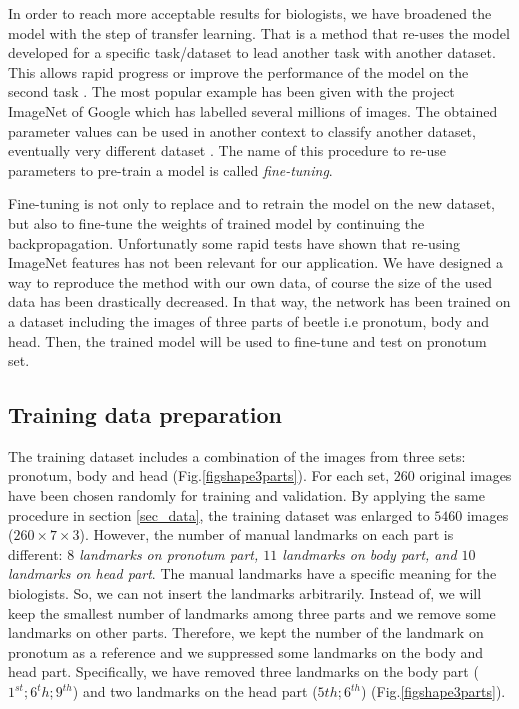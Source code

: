 \documentclass[10pt]{article}
\begin{document}
In order to reach more acceptable results for biologists, we have
broadened the model with the step of transfer learning. That is a
method that re-uses the model developed for a specific task/dataset
to lead  another task with another dataset. This allows rapid progress or improve the performance of the
model on the second task \cite{torrey2009transfer}. The most popular
example has been given with the project ImageNet of Google \cite{imagenet_cvpr09} which has labelled several millions of images. The obtained parameter values can
be used in another context to classify another dataset, eventually
very different dataset \cite{margeta_mri}. The name of this procedure to re-use parameters
to pre-train a model is called \textit{fine-tuning}.

Fine-tuning is not only to replace and to retrain the model on the new
dataset, but also to fine-tune the weights of trained model by continuing the
backpropagation. Unfortunatly some rapid tests have shown that
re-using ImageNet features has not been relevant for our
application. We have designed a way to reproduce the method with our
own data, of course the size of the used data has been drastically decreased.
In that way, the network has been trained on a dataset including
the images of three parts of beetle i.e pronotum, body and head. Then,
the trained model will be used to fine-tune and test on pronotum set.


\subsection{Training data preparation}
The training dataset includes a combination of the images from three
sets: pronotum, body and head (Fig.\ref{figshape3parts}). For each
set, $260$ original images have been chosen randomly for training and
validation. By applying the same procedure in section \ref{sec_data},
the training dataset was enlarged to $5460$ images ($260 \times 7
\times 3$). However, the number of manual landmarks on each part is
different: \textit{$8$ landmarks on pronotum part, $11$ landmarks on
  body part, and $10$ landmarks on head part}. The manual landmarks
have a specific meaning for the biologists. So, we can not insert the
landmarks arbitrarily. Instead of, we will keep the smallest number of
landmarks among three parts and we remove some landmarks on other
parts. Therefore, we kept the number of the landmark on pronotum as a
reference and we suppressed some landmarks on the body and head
part. Specifically, we have removed three landmarks on the body part
($1^{st}; 6^{t}h; 9^{th}$) and two landmarks on the head part ($5{th};
6^{th}$) (Fig.\ref{figshape3parts}).
\end{document}
